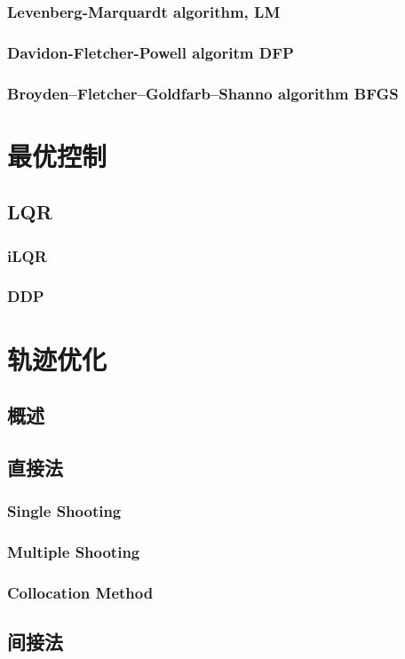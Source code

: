 \subsection{Levenberg-Marquardt algorithm, LM}
\subsection{Davidon-Fletcher-Powell algoritm DFP}
\subsection{Broyden–Fletcher–Goldfarb–Shanno algorithm BFGS}


\chapter{最优控制}
\section{LQR}
\subsection{iLQR}
\subsection{DDP}

\chapter{轨迹优化}
\section{概述}
\section{直接法}
\subsection{Single Shooting}
\subsection{Multiple Shooting}
\subsection{Collocation Method}
\section{间接法}





